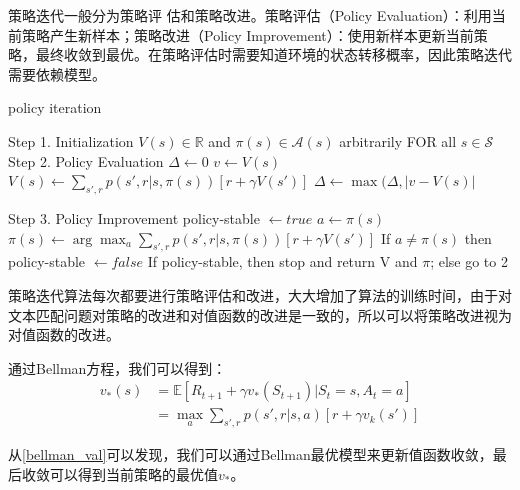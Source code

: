 策略迭代一般分为策略评 估和策略改进。策略评估（Policy Evaluation）：利用当前策略产生新样本；策略改进（Policy Improvement）：使用新样本更新当前策略，最终收敛到最优。在策略评估时需要知道环境的状态转移概率，因此策略迭代需要依赖模型。

\begin{algorithm}[H]
    \small
    \caption{policy iteration}\label{alg:policy_iteration}
    \begin{algorithmic}
        \STATE Step 1. Initialization
        	\STATE $V(s) \in \mathbb{R}$ and $\pi(s) \in \mathcal{A}(s)$ arbitrarily FOR all $s \in \mathcal{S}$
        \STATE Step 2. Policy Evaluation
        \REPEAT
        \STATE $\Delta \leftarrow 0$
        \STATE $v \leftarrow V(s)$
        \STATE $V(s)\leftarrow \sum_{s', r} p(s', r|s, \pi(s))[r + \gamma V(s')]$
        \STATE $\Delta \leftarrow \max(\Delta, |v-V(s)|$
        \ENDFOR

        \UNTIL{$\Delta < \theta$}

        \STATE Step 3. Policy Improvement
        \STATE policy-stable $\leftarrow  true$
        \STATE $a \leftarrow \pi(s)$
        \STATE $\pi(s) \leftarrow \arg\max_a\sum_{s', r}p(s', r|s, \pi(s))[r + \gamma V(s')]$
        \STATE If $a \neq \pi(s)$ then policy-stable $\leftarrow  false$
        \ENDFOR
        \STATE If policy-stable, then stop and return V and $\pi$; else go to 2
    \end{algorithmic}
\end{algorithm}

策略迭代算法每次都要进行策略评估和改进，大大增加了算法的训练时间，由于对文本匹配问题对策略的改进和对值函数的改进是一致的，所以可以将策略改进视为对值函数的改进。

通过Bellman方程，我们可以得到：
\begin{equation}\label{bellman_val}
	\begin{aligned}
		v_*(s) &= \mathbb{E}[R_{t+1}+\gamma v_*(S_{t+1})|S_t=s,A_t=a] \\
			   &= \max_a \sum_{s',r}p(s', r|s, a)[r+\gamma v_k(s')]
	\end{aligned}
\end{equation}

从\eqref{bellman_val}可以发现，我们可以通过Bellman最优模型来更新值函数收敛，最后收敛可以得到当前策略的最优值$v_*$。

